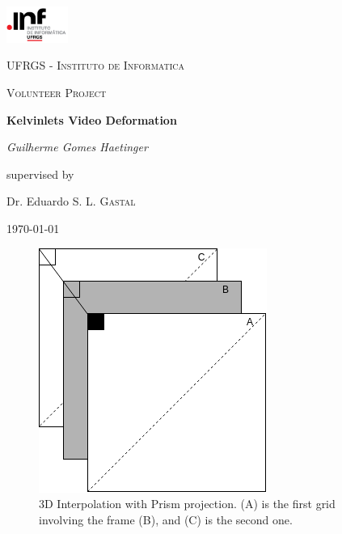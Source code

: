 \documentclass[12pt, a4paper]{report}
\begin{document}
\begin{titlepage}
	\centering
	\includegraphics[width=0.15\textwidth]{res/inf.png}\par\vspace{1cm}
	{\scshape\LARGE UFRGS - Instituto de Informatica \par}
	\vspace{1cm}
	{\scshape\Large Volunteer Project\par}
	\vspace{1.5cm}
	{\huge\bfseries Kelvinlets Video Deformation\par}
	\vspace{2cm}
	{\Large\itshape Guilherme Gomes Haetinger\par}
	\vfill
	supervised by\par
	Dr. Eduardo S. L. \textsc{Gastal}

	\vfill

	{\large \today\par}
\end{titlepage}

\begin{figure}
	\includegraphics[scale=0.5, center]{./res/interpolationExample.png}
	\caption{3D Interpolation with Prism projection. (A) is the first grid involving the frame (B), and (C) is the second one.}
	\label{fig:newInterp}
\end{figure}
\end{document}
